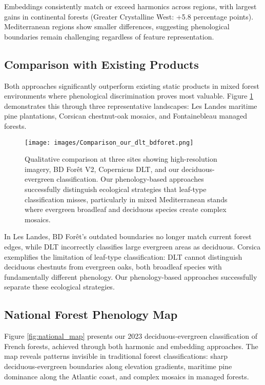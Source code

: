 \documentclass[utf8]{FrontiersinHarvard}
\begin{document}
Embeddings consistently match or exceed harmonics across regions, with largest gains in continental forests (Greater Crystalline West: +5.8 percentage points). Mediterranean regions show smaller differences, suggesting phenological boundaries remain challenging regardless of feature representation.

\subsection{Comparison with Existing Products}

Both approaches significantly outperform existing static products in mixed forest environments where phenological discrimination proves most valuable. Figure \ref{fig:comparison_products} demonstrates this through three representative landscapes: Les Landes maritime pine plantations, Corsican chestnut-oak mosaics, and Fontainebleau managed forests.

\begin{figure}[H]
    \centering
    \texttt{[image: images/Comparison\_our\_dlt\_bdforet.png]}
    \caption{Qualitative comparison at three sites showing high-resolution imagery, BD Forêt V2, Copernicus DLT, and our deciduous-evergreen classification. Our phenology-based approaches successfully distinguish ecological strategies that leaf-type classification misses, particularly in mixed Mediterranean stands where evergreen broadleaf and deciduous species create complex mosaics.}
    \label{fig:comparison_products}
\end{figure}

In Les Landes, BD Forêt's outdated boundaries no longer match current forest edges, while DLT incorrectly classifies large evergreen areas as deciduous. Corsica exemplifies the limitation of leaf-type classification: DLT cannot distinguish deciduous chestnuts from evergreen oaks, both broadleaf species with fundamentally different phenology. Our phenology-based approaches successfully separate these ecological strategies.

\subsection{National Forest Phenology Map}

Figure \ref{fig:national_map} presents our 2023 deciduous-evergreen classification of French forests, achieved through both harmonic and embedding approaches. The map reveals patterns invisible in traditional forest classifications: sharp deciduous-evergreen boundaries along elevation gradients, maritime pine dominance along the Atlantic coast, and complex mosaics in managed forests.
\end{document}
